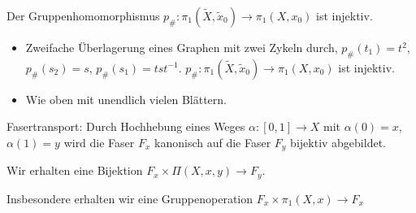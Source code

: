 \begin{kor}
    Der Gruppenhomomorphismus $p_\#: \pi_1(\tilde X, \tilde x_0) \to \pi_1(X, x_0)$ ist injektiv.
\end{kor}

\begin{ex}
    \begin{itemize}
        \item
            Zweifache Überlagerung eines Graphen mit zwei Zykeln durch, $p_\#(t_1) = t^2$, $p_\#(s_2) = s$, $p_\#(s_1) = tst^{-1}$.
            $p_\#: \pi_1(\tilde X, \tilde x_0) \to \pi_1(X, x_0)$ ist injektiv.
        \item
            Wie oben mit unendlich vielen Blättern.
    \end{itemize}
\end{ex}

\begin{df}
    Fasertransport:
    Durch Hochhebung eines Weges $\alpha: [0,1] \to X$ mit $\alpha(0) = x$, $\alpha(1) = y$ wird die Faser $F_x$ kanonisch auf die Faser $F_y$ bijektiv abgebildet.

    Wir erhalten eine Bijektion $F_x \times \Pi(X,x,y) \to F_y$.

    Insbesondere erhalten wir eine Gruppenoperation $F_x \times \pi_1(X, x) \to F_x$
\end{df}

